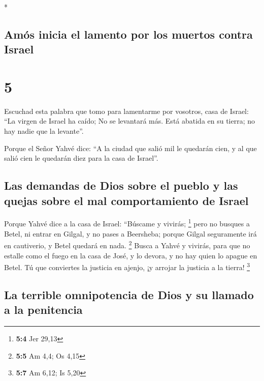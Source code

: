 \begin{paracol}{2}
\begin{otherlanguage}{english}
\end{otherlanguage}

\switchcolumn[0]*

\hypertarget{amuxf3s-inicia-el-lamento-por-los-muertos-contra-israel}{%
\subsection{Amós inicia el lamento por los muertos contra
Israel}\label{amuxf3s-inicia-el-lamento-por-los-muertos-contra-israel}}

\hypertarget{section-8}{%
\section{5}\label{section-8}}

 Escuchad esta palabra que tomo para lamentarme por
vosotros, casa de Israel:  ``La virgen de Israel ha caído;
No se levantará más. Está abatida en su tierra; no hay nadie que la
levante''.

 Porque el Señor Yahvé dice: ``A la ciudad que salió mil
le quedarán cien, y al que salió cien le quedarán diez para la casa de
Israel''.

\hypertarget{las-demandas-de-dios-sobre-el-pueblo-y-las-quejas-sobre-el-mal-comportamiento-de-israel}{%
\subsection{Las demandas de Dios sobre el pueblo y las quejas sobre el
mal comportamiento de
Israel}\label{las-demandas-de-dios-sobre-el-pueblo-y-las-quejas-sobre-el-mal-comportamiento-de-israel}}

 Porque Yahvé dice a la casa de Israel: ``Búscame y
vivirás; \footnote{\textbf{5:4} Jer 29,13}  pero no
busques a Betel, ni entrar en Gilgal, y no pases a Beersheba; porque
Gilgal seguramente irá en cautiverio, y Betel quedará en nada.
\footnote{\textbf{5:5} Am 4,4; Os 4,15}  Busca a Yahvé y
vivirás, para que no estalle como el fuego en la casa de José, y lo
devora, y no hay quien lo apague en Betel.  Tú que
conviertes la justicia en ajenjo, ¡y arrojar la justicia a la tierra!
\footnote{\textbf{5:7} Am 6,12; Is 5,20}

\hypertarget{la-terrible-omnipotencia-de-dios-y-su-llamado-a-la-penitencia}{%
\subsection{La terrible omnipotencia de Dios y su llamado a la
penitencia}\label{la-terrible-omnipotencia-de-dios-y-su-llamado-a-la-penitencia}}


\end{paracol}
